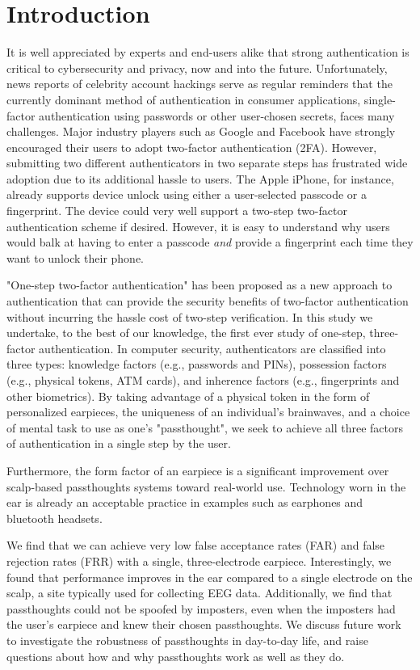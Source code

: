 \documentclass{sigchi}
\begin{document}
\section{Introduction}

It is well appreciated by experts and end-users alike that strong authentication is
critical to cybersecurity and privacy, now and into the future. Unfortunately,
news reports of celebrity account hackings serve as regular reminders that
the currently dominant method of authentication in consumer applications, 
single-factor authentication using passwords or other user-chosen secrets, 
faces many challenges. Major industry players such as Google and
Facebook have strongly encouraged their users to adopt two-factor
authentication (2FA). However, submitting two different 
authenticators in two separate steps has frustrated wide adoption
due to its additional hassle to users. The Apple iPhone, for instance,
already supports device unlock using either a user-selected passcode or a fingerprint. The
device could very well support a two-step two-factor authentication scheme if
desired. However, it is easy to understand why users would balk at having to
enter a passcode \emph{and} provide a fingerprint each time they want to unlock their phone.

"One-step two-factor authentication" has been proposed as a new approach
to authentication that can provide the security benefits of two-factor authentication without incurring the hassle cost of two-step verification.
In this study we undertake, to the best of our knowledge, the first
ever study of one-step, three-factor authentication. In computer security,
authenticators are classified into three types: knowledge factors (e.g., passwords
and PINs), possession factors (e.g., physical tokens, ATM cards), and inherence
factors (e.g., fingerprints and other biometrics). By taking advantage of a physical token 
in the form of personalized earpieces, the uniqueness of an individual's brainwaves, and
a choice of mental task to use as one's "passthought", we seek to achieve all three factors 
of authentication in a single step by the user.

Furthermore, the form factor of an earpiece is a significant improvement over scalp-based passthoughts systems toward real-world use. Technology worn in the ear is already an acceptable practice in examples such as earphones and bluetooth headsets.

We find that we can achieve very low false acceptance rates (FAR) and false rejection rates (FRR) with a single, 
three-electrode earpiece. Interestingly, we found that performance improves in the ear compared to a single electrode on the scalp, a site typically used for collecting EEG data. Additionally, we find that passthoughts could not be spoofed by imposters, even when the imposters had the user's earpiece and knew their chosen passthoughts. We discuss future work to investigate the robustness of passthoughts in day-to-day life, and raise questions about how and why passthoughts work as well as they do.
\end{document}
